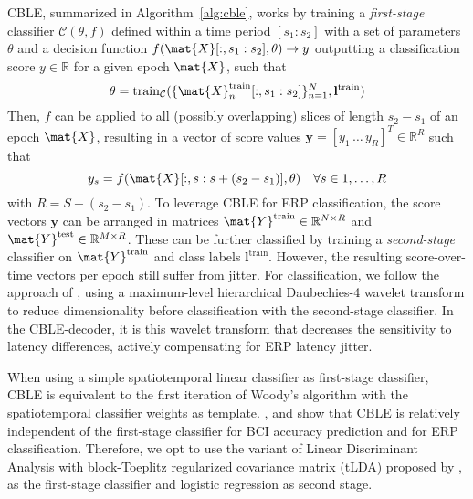 CBLE, summarized in Algorithm~\ref{alg:cble}, works by training a
\textit{first-stage} classifier $\mathcal{C}(\theta,f)$
defined within a time period $[s_1:s_2]$ with a set of parameters $\theta$ and a
decision function $f(\mat{X}[:,s_1:s_2],\theta) \rightarrow
y$ outputting a classification score $y\in\mathbb{R}$ for a given epoch $\mat{X}$,
such that
\begin{equation}
  \theta = \mathrm{train}_\mathcal{C}(\{\mat{X}_n^\mathrm{train}[:,s_1:s_2]\}_{n=1}^N,\mathbf{l}^\mathrm{train})
  \label{eq:cble-train}
\end{equation}
Then,
$f$ can be applied to all (possibly overlapping) slices of length $s_2-s_1$ of
an epoch $\mat{X}$, resulting in a vector of score values
$\mathbf{y}=[y_1\,\ldots\,y_R]^T \in\mathbb{R}^R$ such that
\begin{equation}
  y_s = f(\mat{X}[:,s:s+(s_2-s_1)],\theta)\quad \forall s\in 1,\ldots,R
	\label{eq:score}
\end{equation}
with $R = S-(s_2-s_1)$.
To leverage CBLE for ERP classification, the score vectors $\mathbf{y}$ can be
arranged in matrices $\mat{Y}^\mathrm{train}\in\mathbb{R}^{N\times R}$ and $\mat{Y}^\mathrm{test}\in\mathbb{R}^{M\times R}$.
These can be further classified by training a \textit{second-stage} classifier on
$\mat{Y}^\mathrm{train}$ and class labels $\mathbf{l}^\mathrm{train}$.
However, the resulting score-over-time vectors per epoch still suffer from jitter.
For classification, we follow the approach of \cite{Mowla2017}, using a
maximum-level hierarchical Daubechies-4 wavelet transform to reduce
dimensionality before classification with the second-stage classifier.
In the CBLE-decoder, it is this wavelet transform that decreases the sensitivity
to latency differences, actively compensating for ERP latency jitter.

When using a simple spatiotemporal linear classifier as first-stage classifier,
CBLE is equivalent to the first iteration of Woody's algorithm with the
spatiotemporal classifier weights as template.
\cite{Thompson2012}, \cite{Mowla2017} and \cite{Mowla2020} show
that CBLE is relatively independent of the first-stage classifier for BCI
accuracy prediction and for ERP classification.
Therefore, we opt to use the variant of Linear Discriminant Analysis with block-Toeplitz
regularized covariance matrix (tLDA) proposed by \cite{Sosulski2022}, as the first-stage
classifier and logistic regression as second stage.

